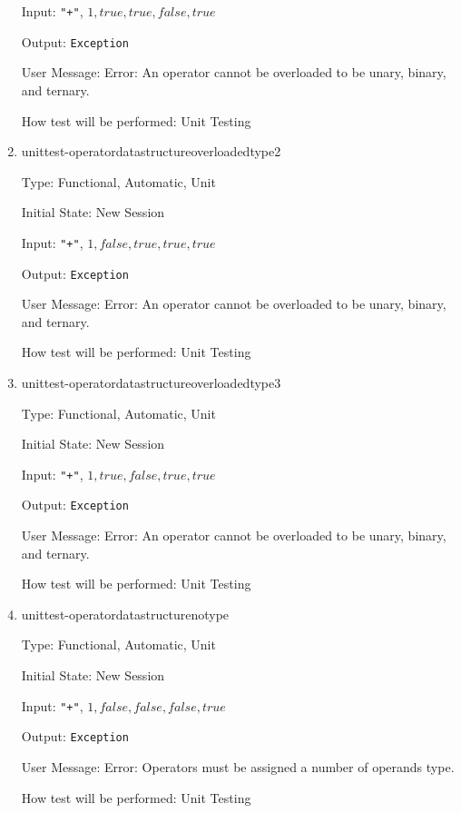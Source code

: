 \documentclass[12pt, titlepage]{article}
\begin{document}
\begin{enumerate}
	Input: \texttt{"+"}, $1, true, true, false, true$
	
	Output: \texttt{Exception}
	
	User Message: Error: An operator cannot be overloaded to be unary, binary, 
	and ternary.
	
	How test will be performed: Unit Testing\\
	
	\item{unittest-operatordatastructureoverloadedtype2}
	
	Type: Functional, Automatic, Unit
	
	Initial State: New Session
	
	Input: \texttt{"+"}, $1, false, true, true, true$
	
	Output: \texttt{Exception}
	
	User Message: Error: An operator cannot be overloaded to be unary, binary, 
	and ternary.
	
	How test will be performed: Unit Testing\\
	
	\item{unittest-operatordatastructureoverloadedtype3}
	
	Type: Functional, Automatic, Unit
	
	Initial State: New Session
	
	Input: \texttt{"+"}, $1, true, false, true, true$
	
	Output: \texttt{Exception}
	
	User Message: Error: An operator cannot be overloaded to be unary, binary, 
	and ternary.
	
	How test will be performed: Unit Testing\\
	
	\item{unittest-operatordatastructurenotype}
	
	Type: Functional, Automatic, Unit
	
	Initial State: New Session
	
	Input: \texttt{"+"}, $1, false, false, false, true$
	
	Output: \texttt{Exception}
	
	User Message: Error: Operators must be assigned a number of operands type.
	
	How test will be performed: Unit Testing\\
	
\end{enumerate}
\end{document}
